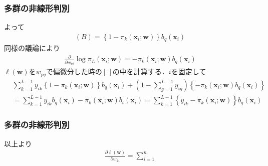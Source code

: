 \documentclass[dvipdfmx,cjk]{beamer}
\theoremstyle{example}
\begin{document}
\begin{frame}
    \frametitle{多群の非線形判別}
    よって
    \begin{align*}
        (B)=\left\{1-\pi_k(\boldsymbol{x}_i;\boldsymbol{w})\right\}b_q(\boldsymbol{x}_i)
    \end{align*}
    同様の議論により
    \begin{align*}
        \frac{\partial}{\partial w_{ki}}\log \pi_L(\boldsymbol{x}_i;\boldsymbol{w})=-\pi_k(\boldsymbol{x}_i;\boldsymbol{w})b_q(\boldsymbol{x}_i)
    \end{align*}
    $\ell(\boldsymbol{w})$を$w_{pq}$で偏微分した時の$\left[\,\right]$の中を計算する．$i$を固定して
    \begin{align*}
         & \sum_{k=1}^{L-1}y_{ik}\left\{1-\pi_k(\boldsymbol{x}_i;\boldsymbol{w})\right\}b_q(\boldsymbol{x}_i)+(1-\sum_{g=1}^{L-1}y_{ig})\left\{-\pi_k(\boldsymbol{x}_i;\boldsymbol{w})b_q(\boldsymbol{x}_i)\right\}   \\
         & =\sum_{k=1}^{L-1}y_{ik}b_q(\boldsymbol{x}_i)-\pi_k(\boldsymbol{x}_i;\boldsymbol{w})b_i(\boldsymbol{x}_i)=\sum_{k=1}^{L-1}\left\{y_{ik}-\pi_k(\boldsymbol{x}_i;\boldsymbol{w})\right\}b_q(\boldsymbol{x}_i)
    \end{align*}
\end{frame}

\begin{frame}
    \frametitle{多群の非線形判別}
    以上より
    \begin{align*}
        \frac{\partial \ell(\boldsymbol{w})}{\partial w_{ki}}=\sum_{i=1}^{n}
    \end{align*}
\end{frame}
\end{document}
